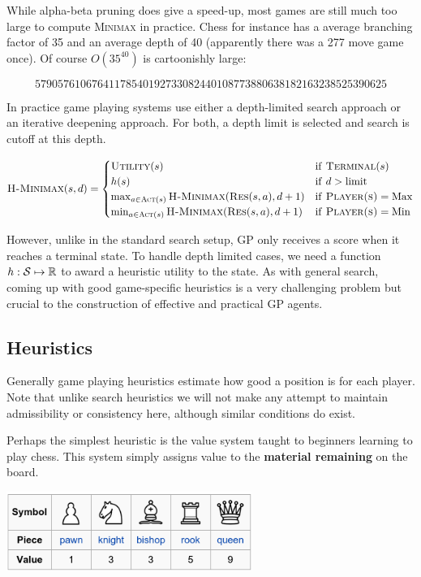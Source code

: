 \documentclass[11pt]{article}
\begin{document}
While alpha-beta pruning does give a speed-up, most games are still much too large to compute \textsc{Minimax} in practice. Chess for instance has a average branching factor of 35 and an average depth of 40 (apparently there was a 277 move game once). Of course $O(35^{40})$ is cartoonishly large:

\[ 57905761067641178540192733082440108773880638182163238525390625\] 

In practice game playing systems use either a depth-limited search approach or an iterative deepening approach. For both, a depth limit is selected and search is cutoff at this depth. 

\[ \mathrm{\textsc{H-Minimax}}(s, d) = \begin{cases} 
  \mathrm{\textsc{Utility}}(s) & \mathrm{if\ } \mathrm{\textsc{Terminal}}(s)  \\
  h(s) & \mathrm{if\ } d > \mathrm{limit}   \\
  \max_{a \in \mathrm{\textsc{Act}}(s) } \mathrm{\textsc{H-Minimax}}(\mathrm{\textsc{Res}}(s, a), d+1) & \mathrm{if\ } \mathrm{\textsc{Player(s)}} = \mathrm{Max}  \\
  \min_{a \in \mathrm{\textsc{Act}}(s) } \mathrm{\textsc{H-Minimax}}(\mathrm{\textsc{Res}}(s, a), d+1) & \mathrm{if\ } \mathrm{\textsc{Player(s)}} = \mathrm{Min} \end{cases}\] 

However, unlike in the standard search setup, GP only receives a score when it reaches a terminal state. To handle depth limited cases, we need a function $h: \mathcal{S} \mapsto \mathbb{R}$ to award a heuristic utility to the state. As with general search, coming up with good game-specific heuristics is a very challenging problem but crucial to the construction of effective and practical GP agents.  

\subsection{Heuristics}

Generally game playing heuristics estimate how good a position is for each player. Note that unlike search heuristics we will not make any attempt to maintain admissibility or consistency here, although similar conditions do exist.

Perhaps the simplest heuristic is the value system taught to beginners learning to play chess. This system simply assigns value to the \textbf{material remaining} on the board. 
\air

\centerline{\includegraphics[width=8cm]{pics/chessvalues1}}
\air
\end{document}

